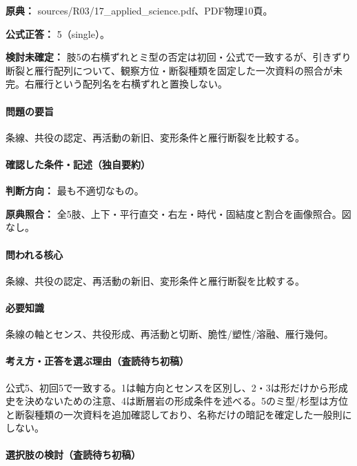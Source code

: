 \noindent\textbf{原典：} sources/R03/17\_applied\_science.pdf、PDF物理10頁。

\textbf{公式正答：} 5（single）。

\par\textbf{検討未確定：} 肢5の右横ずれとミ型の否定は初回・公式で一致するが、引きずり断裂と雁行配列について、観察方位・断裂種類を固定した一次資料の照合が未完。右雁行という配列名を右横ずれと置換しない。

\paragraph{問題の要旨} 条線、共役の認定、再活動の新旧、変形条件と雁行断裂を比較する。

\paragraph{確認した条件・記述（独自要約）}\mbox{}\par

\noindent\textbf{判断方向：} 最も不適切なもの。\par

\noindent\textbf{原典照合：} 全5肢、上下・平行直交・右左・時代・固結度と割合を画像照合。図なし。\par

\paragraph{問われる核心} 条線、共役の認定、再活動の新旧、変形条件と雁行断裂を比較する。

\paragraph{必要知識} 条線の軸とセンス、共役形成、再活動と切断、脆性/塑性/溶融、雁行幾何。

\paragraph{考え方・正答を選ぶ理由（査読待ち初稿）} 公式5、初回5で一致する。1は軸方向とセンスを区別し、2・3は形だけから形成史を決めないための注意、4は断層岩の形成条件を述べる。5のミ型/杉型は方位と断裂種類の一次資料を追加確認しており、名称だけの暗記を確定した一般則にしない。

\paragraph{選択肢の検討（査読待ち初稿）}\mbox{}\par

